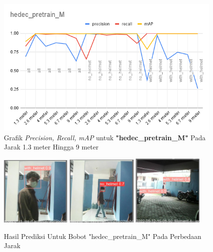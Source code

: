 \begin{enumerate}
  \begin{figure} [h!]
    \centering
    \includegraphics[width=1\textwidth]{gambar/BerdasarkanJarak/hedec_pretrain_M.png}
    \caption{Grafik \emph{Precision, Recall, mAP} untuk \textbf{"hedec\_pretrain\_M"} Pada Jarak 1.3 meter Hingga 9 meter}
    \label{fig:grafvaljarak_hedec_pretrain_M}  
  \end{figure}

  \FloatBarrier

  \begin{figure} [h!]
    \centering
    \includegraphics[width=0.31\textwidth]{gambar/BerdasarkanJarak_v2/val_hedec_pretrain_M/Jarak1_3/val_batch0_pred.jpg}
    \includegraphics[width=0.31\textwidth]{gambar/BerdasarkanJarak_v2/val_hedec_pretrain_M/Jarak5_3/val_batch0_pred.jpg}
    \includegraphics[width=0.31\textwidth]{gambar/BerdasarkanJarak_v2/val_hedec_pretrain_M/Jarak9/val_batch0_pred.jpg}
    \caption{Hasil Prediksi Untuk Bobot "hedec\_pretrain\_M" Pada Perbedaan Jarak}
    \label{fig:valjarak_sample_hedec_pretrain_M}  
  \end{figure}


\end{enumerate}
